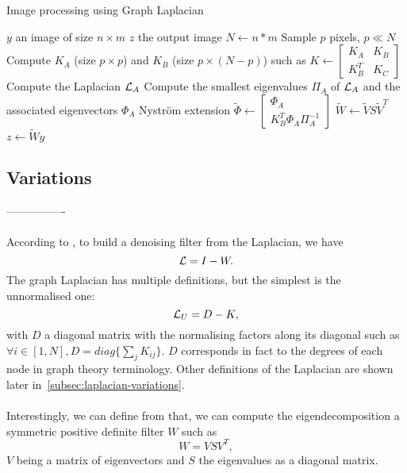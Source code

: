 \begin{algorithm}[H]
 \caption{Image processing using Graph Laplacian}
 \begin{algorithmic}
  \REQUIRE \(y\) an image of size \(n \times m\)
  \ENSURE \(z\) the output image
  \STATE \(N \leftarrow n*m\)
  \STATE Sample \(p\) pixels, \(p \ll N\)
  \STATE {}
  \STATE Compute \(K_A\) (size \(p \times p\)) and \(K_B\) (size \(p \times (N-p)\)) such as \(K \leftarrow \begin{bmatrix} K_A & K_B \\ K_B^T & K_C \end{bmatrix}\)
  \STATE Compute the Laplacian \(\operatorname{\mathcal{L}}_A\)
  \STATE Compute the smallest eigenvalues \(\Pi_A\) of \(\operatorname{\mathcal{L}}_A\) and the associated eigenvectors \(\Phi_A\)
  \STATE Nystr\"om extension \(\tilde{\Phi} \leftarrow \begin{bmatrix} \Phi_A \\ K_B^T \Phi_A \Pi_A^{-1} \end{bmatrix}\)
  \STATE \(\tilde{W} \leftarrow \tilde{V} S \tilde{V}^T\)
  \STATE \(z \leftarrow \tilde{W}y\)
 \end{algorithmic}
\end{algorithm}

\subsection{Variations}

----------------

\paragraph{}

\paragraph{}
According to \cite{modern_tour_2013}, to build a denoising filter from the Laplacian, we have
\[\operatorname{\mathcal{L}} = I - W.\]
The graph Laplacian has multiple definitions, but the simplest is the unnormalised one:
\[\operatorname{\mathcal{L}}_U = D - K,\]
with \(D\) a diagonal matrix with the normalising factors along its diagonal such as \(\forall i \in [1, N], D = diag\{\sum_j K_{ij}\}\).
\(D\) corresponds in fact to the degrees of each node in graph theory terminology.
Other definitions of the Laplacian are shown later in~\ref{subsec:laplacian-variations}.

\paragraph{}
Interestingly, we can define from \cite{glide_2014} that, we can compute the eigendecomposition a symmetric positive definite filter \(W\) such as
\[W = VSV^T,\]
\(V\) being a matrix of eigenvectors and \(S\) the eigenvalues as a diagonal matrix.

